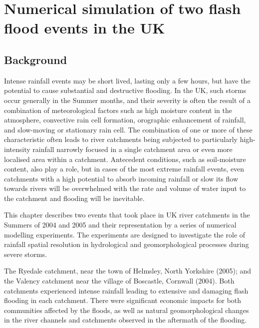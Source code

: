 \chapter{Numerical simulation of two flash flood events in the UK}
\label{chapter_events}

\section{Background}
Intense rainfall events may be short lived, lasting only a few hours, but have the potential to cause substantial and destructive flooding. In the UK, such storms occur generally in the Summer months, and their severity is often the result of a combination of meteorological factors such as high moisture content in the atmosphere, convective rain cell formation, orographic enhancement of rainfall, and slow-moving or stationary rain cell. The combination of one or more of these characteristic often leads to river catchments being subjected to particularly high-intensity rainfall narrowly focused in a single catchment area or even more localised area within a catchment. Antecedent conditions, such as soil-moisture content, also play a role, but in cases of the most extreme rainfall events, even catchments with a high potential to absorb incoming rainfall or slow its flow towards rivers will be overwhelmed with the rate and volume of water input to the catchment and flooding will be inevitable.

This chapter describes two events that took place in UK river catchments in the Summers of 2004 and 2005 and their representation by a series of numerical modelling experiments. The experiments are designed to investigate the role of rainfall spatial resolution in hydrological and geomorphological processes during severe storms. %

The Ryedale catchment, near the town of Helmsley, North Yorkshire (2005); and the Valency catchment near the village of Boscastle, Cornwall (2004). Both catchments experienced intense rainfall leading to extensive and damaging flash flooding in each catchment. There were significant economic impacts for both communities affected by the floods, as well as natural geomorphological changes in the river channels and catchments observed in the aftermath of the flooding. 

